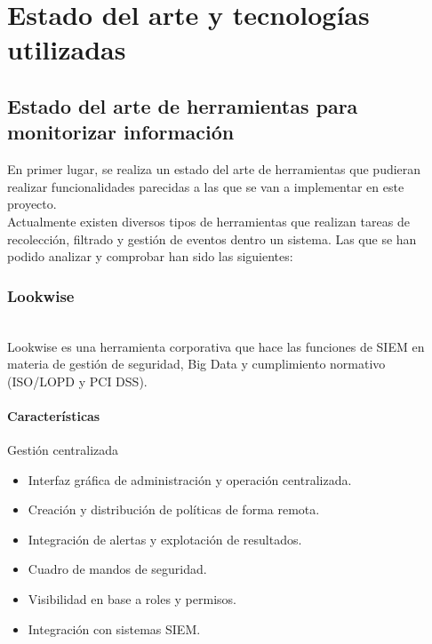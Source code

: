 \chapter[Estado del arte y tecnologías utilizadas]{Estado del arte y tecnologías utilizadas}
\label{chap:estado del arte}

\section[Estado del arte de herramientas para monitorizar información]{Estado del arte de herramientas para monitorizar información}

En primer lugar, se realiza un estado del arte de herramientas que pudieran realizar funcionalidades parecidas a las que se van a implementar en este proyecto.\\

Actualmente existen diversos tipos de herramientas que realizan tareas de recolección, filtrado y gestión de eventos dentro un sistema. Las que se han podido analizar y comprobar han sido las siguientes:

\subsection{Lookwise}
\\

Lookwise es una herramienta corporativa que hace las funciones de SIEM en materia de gestión de seguridad, Big Data y cumplimiento normativo (ISO/LOPD y PCI DSS).

\subsubsection{Características}

Gestión centralizada
\begin{itemize}
\item Interfaz gráfica de administración y operación centralizada.
\item Creación y distribución de políticas de forma remota.
\item Integración de alertas y explotación de resultados.
\item Cuadro de mandos de seguridad.
\item Visibilidad en base a roles y permisos.
\item Integración con sistemas SIEM.
\end{itemize}

